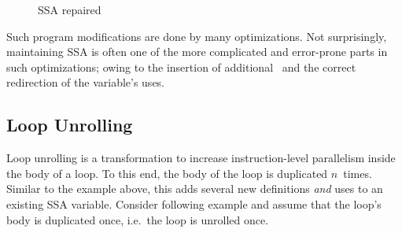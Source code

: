 \begin{figure}[htbp]
	\centering
	\qquad
	\caption{SSA repaired}
	\label{fig:withphis}
\end{figure}

Such program modifications are done by many optimizations. 
Not surprisingly, maintaining SSA is often one of the more complicated and error-prone parts in such optimizations;
owing to the insertion of additional \phiops\ and the correct redirection of the variable's uses.

\subsection{Loop Unrolling}

Loop unrolling is a transformation to increase instruction-level parallelism inside the body of a loop.
To this end, the body of the loop is duplicated $n$~times. 
Similar to the example above, this adds several new definitions \emph{and} uses to an existing SSA variable. 
Consider following example and assume that the loop's body is duplicated once, i.e.~the loop is unrolled once.

